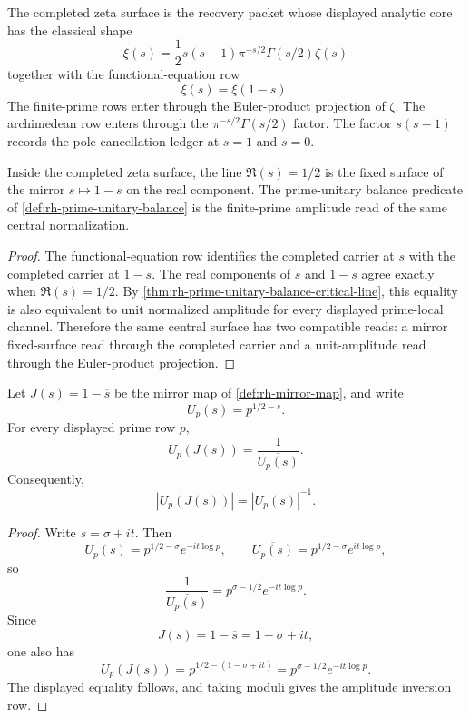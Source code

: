 \begin{definition}
\label{def:rh-completed-zeta-surface}
The completed zeta surface is the recovery packet whose displayed analytic
core has the classical shape
$$
\xi(s)=\frac{1}{2}s(s-1)\pi^{-s/2}\Gamma(s/2)\zeta(s)
$$
together with the functional-equation row
$$
\xi(s)=\xi(1-s).
$$
The finite-prime rows enter through the Euler-product projection of $\zeta$.
The archimedean row enters through the $\pi^{-s/2}\Gamma(s/2)$ factor.  The
factor $s(s-1)$ records the pole-cancellation ledger at $s=1$ and $s=0$.
\end{definition}

\begin{proposition}
\label{prop:rh-critical-surface-self-dual}
Inside the completed zeta surface, the line $\Re(s)=1/2$ is the fixed surface
of the mirror $s\mapsto 1-s$ on the real component.  The prime-unitary
balance predicate of \autoref{def:rh-prime-unitary-balance} is the
finite-prime amplitude read of the same central normalization.
\end{proposition}

\begin{proof}
The functional-equation row identifies the completed carrier at $s$ with the
completed carrier at $1-s$.  The real components of $s$ and $1-s$ agree
exactly when $\Re(s)=1/2$.  By
\autoref{thm:rh-prime-unitary-balance-critical-line}, this equality is also
equivalent to unit normalized amplitude for every displayed prime-local
channel.  Therefore the same central surface has two compatible reads: a
mirror fixed-surface read through the completed carrier and a unit-amplitude
read through the Euler-product projection.
\end{proof}

\begin{proposition}
\label{prop:rh-prime-mirror-inversion}
Let $J(s)=1-\overline{s}$ be the mirror map of
\autoref{def:rh-mirror-map}, and write
$$
U_p(s)=p^{1/2-s}.
$$
For every displayed prime row $p$,
$$
U_p(J(s))=\frac{1}{\overline{U_p(s)}}.
$$
Consequently,
$$
\left|U_p(J(s))\right|=
\left|U_p(s)\right|^{-1}.
$$
\end{proposition}

\begin{proof}
Write $s=\sigma+it$.  Then
$$
U_p(s)=p^{1/2-\sigma}e^{-it\log p},
\qquad
\overline{U_p(s)}=p^{1/2-\sigma}e^{it\log p},
$$
so
$$
\frac{1}{\overline{U_p(s)}}=
p^{\sigma-1/2}e^{-it\log p}.
$$
Since
$$
J(s)=1-\overline{s}=1-\sigma+it,
$$
one also has
$$
U_p(J(s))=p^{1/2-(1-\sigma+it)}
=p^{\sigma-1/2}e^{-it\log p}.
$$
The displayed equality follows, and taking moduli gives the amplitude
inversion row.
\end{proof}

